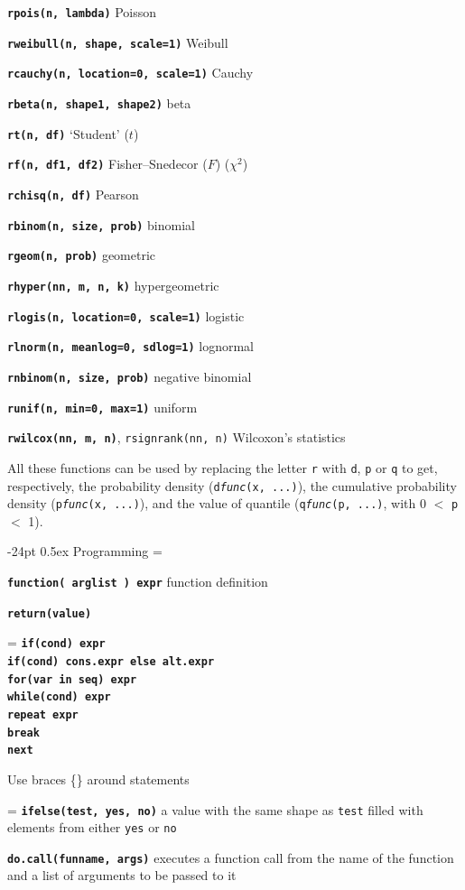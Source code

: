 \documentclass[10pt,landscape]{article}
\makeatletter
\renewcommand\section{\@startsection{section}{1}{0mm}%
                                     {-24pt}%
                                     {0.5ex}%
                                {\color{blue}\normalfont\large\bfseries}}
\newcommand{\code}{\texttt}
\newcommand{\bcode}[1]{\texttt{\textbf{#1}}}
\makeatother
\begin{document}
\begin{multicols*}{3}
\bcode{rpois(n, lambda)} Poisson

\bcode{rweibull(n, shape, scale=1)} Weibull

\bcode{rcauchy(n, location=0, scale=1)} Cauchy  

\bcode{rbeta(n, shape1, shape2)} beta

\bcode{rt(n, df)} `Student' ($t$)  

\bcode{rf(n, df1, df2)} Fisher--Snedecor ($F$)  ($\chi^2$)  

\bcode{rchisq(n, df)} Pearson 

\bcode{rbinom(n, size, prob)} binomial  

\bcode{rgeom(n, prob)} geometric  

\bcode{rhyper(nn, m, n, k)} hypergeometric  

\bcode{rlogis(n, location=0, scale=1)} logistic  

\bcode{rlnorm(n, meanlog=0, sdlog=1)} lognormal  

\bcode{rnbinom(n, size, prob)} negative binomial  

\bcode{runif(n, min=0, max=1)} uniform  

\bcode{rwilcox(nn, m, n)}, \code{rsignrank(nn, n)} Wilcoxon's statistics  

All these functions can be used by replacing the letter \code{r} with
\code{d}, \code{p} or \code{q} to get, respectively, the probability
density (\code{d\textsl{func}(x, ...)}), the cumulative probability
density (\code{p\textsl{func}(x, ...)}), and the value of quantile
(\code{q\textsl{func}(p, ...)}, with 0 $<$ \code{p} $<$ 1).





\section{Programming}
\everypar={\hangindent=9mm}

\bcode{function( arglist ) expr} function definition

\bcode{return(value)}

\everypar={\hangindent=0mm}
\bcode{if(cond) expr\\
if(cond) cons.expr  else  alt.expr\\
for(var in seq) expr\\
while(cond) expr\\
repeat expr\\
break\\
next}

Use braces \{\} around statements


\everypar={\hangindent=9mm}
\bcode{ifelse(test, yes, no)} a value with the same shape as \code{test} filled with elements
from either \code{yes} or \code{no} 

\bcode{do.call(funname, args)} executes a function call from the name of
  the function and a list of arguments to be passed to it

\end{multicols*}
\end{document}
